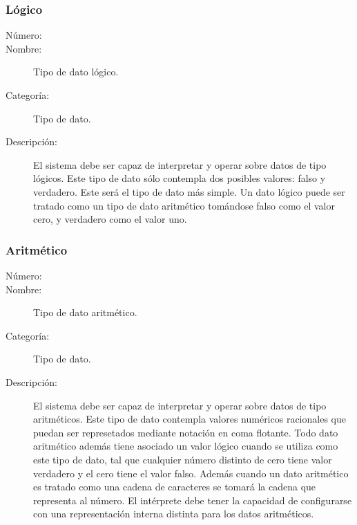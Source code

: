 \subsubsection{Lógico}
	\begin{description}
		\item [Número:] \cn
		\item [Nombre:] Tipo de dato lógico.
		\item [Categoría:] Tipo de dato.
		\item [Descripción:] El sistema debe ser capaz de interpretar y operar sobre datos de tipo lógicos. Este tipo
		de dato sólo contempla dos posibles valores: falso y verdadero. Este será el tipo de dato más simple. Un dato lógico
		puede ser tratado como un tipo de dato aritmético tomándose falso como el valor cero, y verdadero como el valor uno.
	\end {description}
\subsubsection{Aritmético}
	\begin{description}
		\item [Número:] \cn
		\item [Nombre:] Tipo de dato aritmético.
		\item [Categoría:] Tipo de dato.
		\item [Descripción:] El sistema debe ser capaz de interpretar y operar sobre datos de tipo aritméticos. Este tipo
		de dato contempla valores numéricos racionales que puedan ser represetados mediante notación en coma flotante. Todo dato aritmético además tiene asociado un valor lógico cuando se utiliza como este
		tipo de dato, tal que cualquier número distinto de cero tiene valor verdadero y el cero tiene el valor falso. Además cuando un dato aritmético
		es tratado como una cadena de caracteres se tomará la cadena que representa al número. El intérprete debe tener la capacidad de configurarse con una representación interna distinta para los datos aritméticos.
	\end {description}

